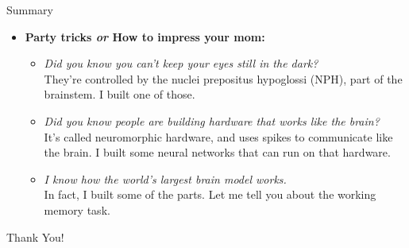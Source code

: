 \documentclass[handout,aspectratio=169]{beamer}
\begin{document}
\begin{frame}{Summary}
	\begin{itemize}
		\item \textbf{Party tricks \emph{or} How to impress your mom:}\\[0.25cm]
		\begin{itemize}
			\setlength{\itemsep}{0.5cm}
			\item \emph{Did you know you can't keep your eyes still in the dark?}\\
			They're controlled by the nuclei prepositus hypoglossi (NPH), part of the brainstem. I built one of those.
			\item \emph{Did you know people are building hardware that works like the brain?}\\
			It's called neuromorphic hardware, and uses spikes to communicate like the brain. I built some neural networks that can run on that hardware.
			\item \emph{I know how the world's largest brain model works.}\\
			In fact, I built some of the parts. Let me tell you about the working memory task.
		\end{itemize}
	\end{itemize}
\end{frame}

\begin{frame}{}
	\centering
	{\Huge Thank You!}
\end{frame}
\end{document}

